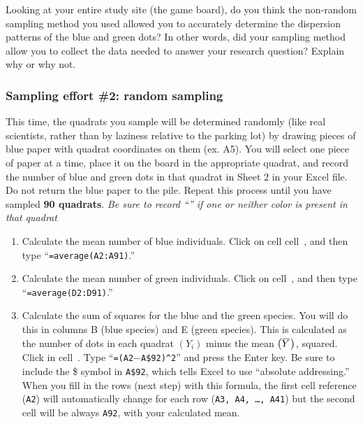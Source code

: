\documentclass[12pt, hidelinks]{exam}
\newcommand*\meanY{\overline{Y}\kern0.67pt}
\newcommand*\xcell[1]{cell~\liningnum{#1}}
\begin{document}
\begin{questions}

\question
Looking at your entire study site (the game board), do you think 
the non-random sampling method you used allowed you to accurately 
determine the dispersion patterns of the
blue and green dots? In other words, did your sampling method allow you
to collect the data needed to answer your research question? Explain why
or why not.

\vspace{6\baselineskip}

\subsubsection*{Sampling effort \#2: random sampling}

This time, the quadrats you sample will be determined randomly (like real
scientists, rather
than by laziness relative to the parking lot) by drawing pieces of blue
paper with quadrat coordinates on them (ex. {\liningnum A5}). You will select one
piece of paper at a time, place it on the board in the appropriate
quadrat, and record the number of blue and green dots in that quadrat in
Sheet 2 in your Excel file. Do not return the blue paper to the pile.
Repeat this process until you have sampled \textbf{90 quadrats}.
\emph{Be sure to record “{}” if one or neither color is present in that
	quadrat}



\begin{enumerate}
\item Calculate the mean number of blue individuals. Click on cell \xcell{A92}, and then type
“\texttt{=average(A2:A91)}.”


\item Calculate the mean number of green individuals. Click on \xcell{D92}, and then type
“\texttt{=average(D2:D91)}.”


\item Calculate the sum of squares for the blue and the green species. You will do this in columns B (blue species) and E (green species). This is calculated as the number of dots in each quadrat $\left( Y_i \right)$ minus the mean $\left( \meanY \right)$,
squared. Click in \xcell{B2}. Type “\texttt{=(A2$-$A\$92)\textasciicircum2}” and press the Enter key. 
Be sure to include the \$ symbol in \texttt{A\$92}, which tells Excel to use “absolute addressing.” When you fill in the rows (next step) with this formula, the first cell reference (\texttt{A2}) will automatically change for each row (\texttt{A3,\,A4,\,\dots,\,A41}) but the second cell will be always \texttt{A92}, with your calculated mean. 


\end{enumerate}
\end{questions}
\end{document}
